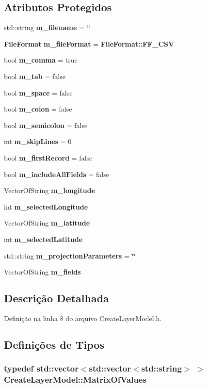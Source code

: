 \subsection*{Atributos Protegidos}
\begin{DoxyCompactItemize}
\item 
std\+::string {\bf m\+\_\+filename} = \char`\"{}\char`\"{}
\item 
{\bf File\+Format} {\bf m\+\_\+file\+Format} = {\bf File\+Format\+::\+F\+F\+\_\+\+C\+SV}
\item 
bool {\bf m\+\_\+comma} = true
\item 
bool {\bf m\+\_\+tab} = false
\item 
bool {\bf m\+\_\+space} = false
\item 
bool {\bf m\+\_\+colon} = false
\item 
bool {\bf m\+\_\+semicolon} = false
\item 
int {\bf m\+\_\+skip\+Lines} = 0
\item 
bool {\bf m\+\_\+first\+Record} = false
\item 
bool {\bf m\+\_\+include\+All\+Fields} = false
\item 
Vector\+Of\+String {\bf m\+\_\+longitude}
\item 
int {\bf m\+\_\+selected\+Longitude}
\item 
Vector\+Of\+String {\bf m\+\_\+latitude}
\item 
int {\bf m\+\_\+selected\+Latitude}
\item 
std\+::string {\bf m\+\_\+projection\+Parameters} = \char`\"{}\char`\"{}
\item 
Vector\+Of\+String {\bf m\+\_\+fields}
\end{DoxyCompactItemize}


\subsection{Descrição Detalhada}


Definição na linha 8 do arquivo Create\+Layer\+Model.\+h.



\subsection{Definições de Tipos}
\subsubsection[{Matrix\+Of\+Values}]{\setlength{\rightskip}{0pt plus 5cm}typedef std\+::vector$<$std\+::vector$<$std\+::string$>$ $>$ {\bf Create\+Layer\+Model\+::\+Matrix\+Of\+Values}}\label{class_create_layer_model_ad6cb89f9d36aab1268e26e39c28501a3}


